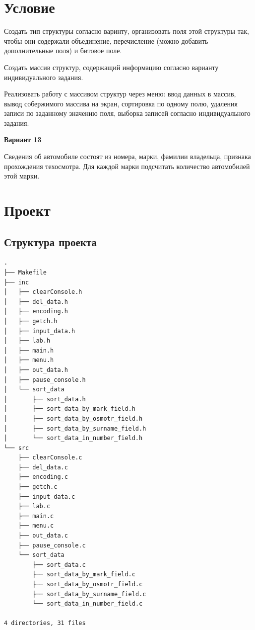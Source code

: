 \documentclass[12pt, a4paper]{article}
\begin{document}
\maketitle
\setcounter{page}{2}

\renewcommand{\contentsname}{Содержание}
\tableofcontents
\newpage

\labheading


\labreport

\section{Условие}

Создать тип структуры согласно варинту, организовать поля этой структуры так, чтобы они содержали объединение, перечисление (можно добавить дополнительные поля) и битовое поле.

Создать массив структур, содержащий информацию согласно варианту индивидуального задания.

Реализовать работу с массивом структур через меню: ввод данных в массив, вывод собержимого массива на экран, сортировка по одному полю, удаления записи по заданному значению поля, выборка записей согласно индивидуального задания.

\begin{center}
    \textbf{Вариант 13}
\end{center}

Сведения об автомобиле состоят из номера, марки, фамилии владельца, признака прохождения техосмотра. Для каждой марки подсчитать количество автомобилей этой марки.

\section{Проект}

\subsection{Структура проекта}

\begin{verbatim}
.
├── Makefile
├── inc
│   ├── clearConsole.h
│   ├── del_data.h
│   ├── encoding.h
│   ├── getch.h
│   ├── input_data.h
│   ├── lab.h
│   ├── main.h
│   ├── menu.h
│   ├── out_data.h
│   ├── pause_console.h
│   └── sort_data
│       ├── sort_data.h
│       ├── sort_data_by_mark_field.h
│       ├── sort_data_by_osmotr_field.h
│       ├── sort_data_by_surname_field.h
│       └── sort_data_in_number_field.h
└── src
    ├── clearConsole.c
    ├── del_data.c
    ├── encoding.c
    ├── getch.c
    ├── input_data.c
    ├── lab.c
    ├── main.c
    ├── menu.c
    ├── out_data.c
    ├── pause_console.c
    └── sort_data
        ├── sort_data.c
        ├── sort_data_by_mark_field.c
        ├── sort_data_by_osmotr_field.c
        ├── sort_data_by_surname_field.c
        └── sort_data_in_number_field.c

4 directories, 31 files
\end{verbatim}
\end{document}

